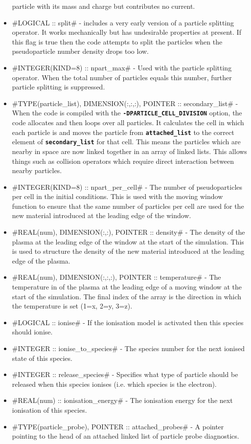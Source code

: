 \documentclass[12pt,a4paper]{article}
\newcommand{\inlinecode}[1]{{\color{warwickred} \bf\texttt{#1}}}
\newcommand{\EPOCH}{{\color{warwickdark}\fontfamily{phv}\selectfont{EPOCH}}}
\begin{document}
\begin{itemize}
  particle with its mass and charge but contributes no current.
\item #LOGICAL :: split# - {\EPOCH} includes a very early version of a particle
  splitting operator. It works mechanically but has undesirable properties at
  present. If this flag is true then the code attempts to split the particles
  when the pseudoparticle number density drops too low.
\item #INTEGER(KIND=8) :: npart_max# - Used with the particle splitting
  operator. When the total number of particles equals this number, further
  particle splitting is suppressed.
\item #TYPE(particle_list), DIMENSION(:,:,:), POINTER :: secondary_list# - When
  the code is compiled with the \inlinecode{-DPARTICLE\_CELL\_DIVISION} option,
  the code allocates\linebreak \inlinecode{secondary\_list(0:nx+1,0:ny+1,0:nz+1)} and then
  loops over all particles. It calculates the cell in which each particle is and
  moves the particle from \inlinecode{attached\_list} to the correct element of
  \inlinecode{secondary\_list} for that cell. This means the particles which are
  nearby in space are now linked together in an array of linked lists. This
  allows things such as collision operators which require direct interaction
  between nearby particles.
\item #INTEGER(KIND=8) :: npart_per_cell# - The number of pseudoparticles per
  cell in the initial conditions. This is used with the moving window function
  to ensure that the same number of particles per cell are used for the new
  material introduced at the leading edge of the window.
\item #REAL(num), DIMENSION(:,:), POINTER :: density# - The density of the
  plasma at the leading edge of the window at the start of the simulation. This
  is used to structure the density of the new material introduced at the leading
  edge of the plasma.
\item #REAL(num), DIMENSION(:,:,:), POINTER :: temperature# - The temperature
  in of the plasma at the leading edge of a moving window at the start of the
  simulation. The final index of the array is the direction in which the
  temperature is set (1=x, 2=y, 3=z).
\item #LOGICAL :: ionise# - If the ionisation model is activated then this
  species should ionise.
\item #INTEGER :: ionise_to_species# - The species number for the next ionised
  state of this species.
\item #INTEGER :: release_species# - Specifies what type of particle should be
  released when this species ionises (i.e. which species is the electron).
\item #REAL(num) :: ionisation_energy# - The ionisation energy for the next
  ionisation of this species.
\item #TYPE(particle_probe), POINTER :: attached_probes# - A pointer pointing to
  the head of an attached linked list of particle probe diagnostics.
\end{itemize}
\end{document}
